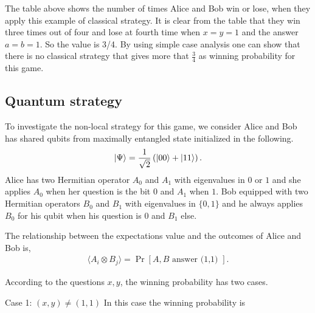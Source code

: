 The table above shows the number of times Alice and Bob win or lose, when they apply this example of classical strategy. It is clear from the table that they win three times out of four and lose at fourth time when $x=y=1$ and the answer $a=b=1$. So the value is 3/4. By using simple case analysis  one can show that there is no classical strategy that gives more that $\frac{3}{4}$ as winning probability for this game.

\subsection{Quantum strategy}\hfill \break
To investigate the non-local strategy for this game, we consider Alice and Bob has shared qubits from maximally  entangled state initialized in the following.
\begin{equation}
\ket{\Psi }= \frac{1}{\sqrt{2}}\left( \ket{00} +\ket{11} \right)\label{EQ:1} .
\end{equation}
Alice has two Hermitian operator $A_0$ and $A_1$ with eigenvalues in $0$ or $1$ and she applies $A_0$ when her question is  the bit $0$ and $A_1$ when $1$. Bob  equipped with two Hermitian operators $B_0$ and $B_1$ with eigenvalues in $\{0, 1\}$ and he always applies $B_0$ for his qubit when his question is $0$ and $B_1$ else. 

The relationship between the expectations value and the outcomes of Alice and Bob is,
\begin{align}
\langle A_i\otimes B_j\rangle=\Pr[ A,B \text{ answer (1,1) }].
\end{align}


According to the questions $x,y$, the winning probability has two cases.

Case 1: $ (x,y)\neq (1,1)$
In this case the winning probability is


